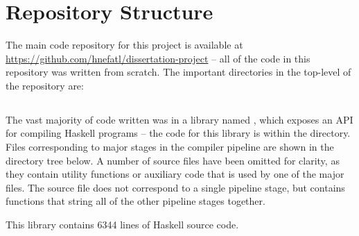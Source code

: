 \documentclass[dissertation.tex]{subfiles}
\begin{document}
\section{Repository Structure}
{

    \begin{minipage}{0.7\textwidth}
    \vspace{-0.5cm}
    The main code repository for this project is available at \url{https://github.com/hnefatl/dissertation-project} --
    all of the code in this repository was written from scratch. The important directories in the top-level of the
    repository are:
    \end{minipage}
    \hspace{5mm}
    \begin{minipage}{0.2\textwidth}
    \vspace{0pt}
    \footnotesize
    \directorystructure{
    [./
        [app]
        [benchmarks]
        [src]
        [test]
    ]
    }
    \end{minipage}

    \subsection{}
    {
        \begin{minipage}{0.7\textwidth}
        \vspace{-5cm}
        The vast majority of code written was in a library named , which exposes an API for
        compiling Haskell programs -- the code for this library is within the  directory. Files
        corresponding to major stages in the compiler pipeline are shown in the directory tree below. A number of source
        files have been omitted for clarity, as they contain utility functions or auxiliary code that is used by one of
        the major files. The  source file does not correspond to a single pipeline stage, but
        contains functions that string all of the other pipeline stages together.

        This library contains 6344 lines of Haskell source code.
        \end{minipage}
        \hspace{5mm}
        \begin{minipage}{0.2\textwidth}
        \vspace{0pt}
        \footnotesize
        \end{minipage}
    }
}
\end{document}
